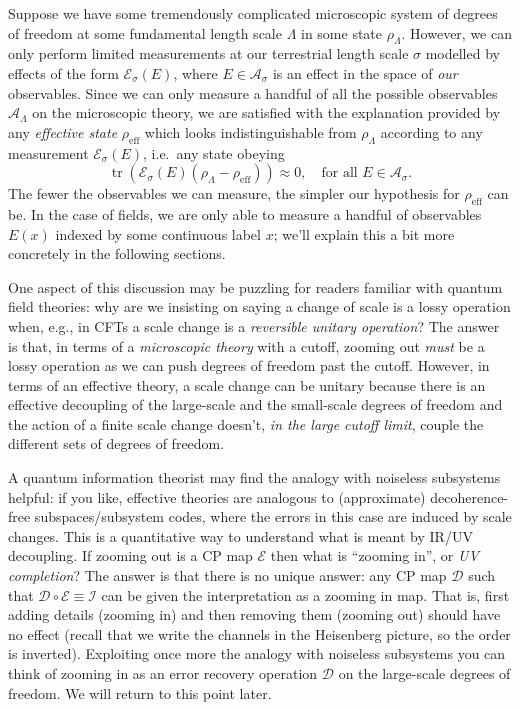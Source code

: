 \documentclass[11pt]{amsart}
\DeclareMathOperator{\tr}{tr}
\theoremstyle{plain}%
\theoremstyle{definition}
\theoremstyle{remark}
\begin{document}
Suppose we have some tremendously complicated microscopic system of degrees of freedom at some fundamental length scale $\Lambda$ in some state $\rho_\Lambda$. However, we can only perform limited measurements at our terrestrial length scale $\sigma$ modelled by effects of the form $\mathcal{E}_{\sigma}(E)$, where $E \in \mathcal{A}_{\sigma}$ is an effect in the space of \emph{our} observables. Since we can only measure a handful of all the possible observables $\mathcal{A}_\Lambda$ on the microscopic theory, we are satisfied with the explanation provided by any \emph{effective state} $\rho_{\text{eff}}$ which looks indistinguishable from $\rho_\Lambda$ according to any measurement $\mathcal{E}_{\sigma}(E)$, i.e.\ any state obeying
\begin{equation}
	\tr(\mathcal{E}_{\sigma}(E) (\rho_\Lambda - \rho_{\text{eff}})) \approx 0, \quad \text{for all } E\in \mathcal{A}_\sigma.
\end{equation}
The fewer the observables we can measure, the simpler our hypothesis for $\rho_{\text{eff}}$ can be. In the case of fields, we are only able to measure a handful of observables $E(x)$ indexed by some continuous label $x$; we'll explain this a bit more concretely in the following sections.

One aspect of this discussion may be puzzling for readers familiar with quantum field theories: why are we insisting on saying a change of scale is a lossy operation when, e.g., in CFTs a scale change is a \emph{reversible unitary operation}? The answer is that, in terms of a \emph{microscopic theory} with a cutoff, zooming out \emph{must} be a lossy operation as we can push degrees of freedom past the cutoff. However, in terms of an effective theory, a scale change can be unitary because there is an effective decoupling of the large-scale  and the small-scale degrees of freedom and the action of a finite scale change doesn't, \emph{in the large cutoff limit}, couple the different sets of degrees of freedom. 

A quantum information theorist may find the analogy with noiseless subsystems helpful: if you like, effective theories are analogous to (approximate) decoherence-free subspaces/subsystem codes, where the errors in this case are induced by scale changes. This is a quantitative way to understand what is meant by IR/UV decoupling. If zooming out is a CP map $\mathcal{E}$ then what is ``zooming in'', or \emph{UV completion}? The answer is that there is no unique answer: any CP map $\mathcal{D}$ such that $\mathcal{D}\circ \mathcal{E} \equiv \mathcal{I}$ can be given the interpretation as a zooming in map. That is, first adding details (zooming in) and then removing them (zooming out) should have no effect (recall that we write the channels in the Heisenberg picture, so the order is inverted). Exploiting once more the analogy with noiseless subsystems you can think of zooming in as an error recovery operation $\mathcal{D}$ on the large-scale degrees of freedom. We will return to this point later.
\end{document}
